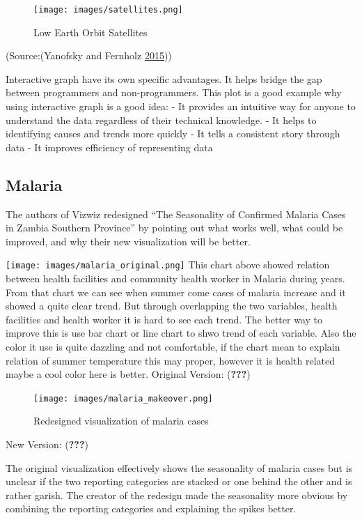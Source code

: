 \documentclass[]{book}
\begin{document}
\begin{figure}
\centering
\texttt{[image: images/satellites.png]}
\caption{Low Earth Orbit Satellites}
\end{figure}

(Source:(Yanofsky and Fernholz \protect\hyperlink{ref-Satellite}{2015}))

Interactive graph have its own specific advantages. It helps bridge the gap between programmers and non-programmers. This plot is a good example why using interactive graph is a good idea:
- It provides an intuitive way for anyone to understand the data regardless of their technical knowledge.
- It helps to identifying causes and trends more quickly
- It tells a consistent story through data
- It improves efficiency of representing data

\hypertarget{malaria}{%
\subsection{Malaria}\label{malaria}}

The authors of Vizwiz redesigned ``The Seasonality of Confirmed Malaria Cases in Zambia Southern Province'' by pointing out what works well, what could be improved, and why their new visualization will be better.

\texttt{[image: images/malaria\_original.png]}
This chart above showed relation between health facilities and community health worker in Malaria during years. From that chart we can see when summer come cases of malaria increase and it showed a quite clear trend.
But through overlapping the two variables, health facilities and health worker it is hard to see each trend. The better way to improve this is use bar chart or line chart to shwo trend of each variable. Also the color it use is quite dazzling and not comfortable, if the chart mean to explain relation of summer temperature this may proper, however it is health related maybe a cool color here is better.
Original Version: ({\textbf{???}})

\begin{figure}
\centering
\texttt{[image: images/malaria\_makeover.png]}
\caption{Redesigned visualization of malaria cases}
\end{figure}

New Version: ({\textbf{???}})

The original visualization effectively shows the seasonality of malaria cases but is unclear if the two reporting categories are stacked or one behind the other and is rather garish. The creator of the redesign made the seasonality more obvious by combining the reporting categories and explaining the spikes better.
\end{document}
